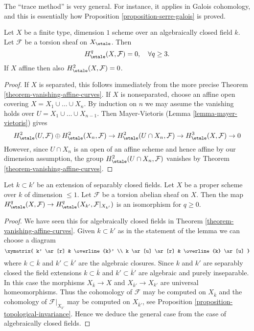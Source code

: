 \begin{remarks}
\label{remarks-on-above}
The ``trace method'' is very general. For instance, it applies in Galois
cohomology, and this is essentially how
Proposition \ref{proposition-serre-galois} is proved.
\end{remarks}

\begin{theorem}
\label{theorem-vanishing-curves}
Let $X$ be a finite type, dimension $1$ scheme over an
algebraically closed field $k$. Let $\mathcal{F}$ be a torsion sheaf
on $X_\etale$. Then
$$
H_\etale^q(X, \mathcal{F}) = 0, \quad \forall q \geq 3.
$$
If $X$ affine then also $H_\etale^2(X, \mathcal{F}) = 0$.
\end{theorem}

\begin{proof}
If $X$ is separated, this follows immediately from the more precise
Theorem \ref{theorem-vanishing-affine-curves}.
If $X$ is nonseparated, choose an affine open covering
$X = X_1 \cup \ldots \cup X_n$. By induction on $n$ we may assume
the vanishing holds over $U = X_1 \cup \ldots \cup X_{n - 1}$.
Then Mayer-Vietoris (Lemma \ref{lemma-mayer-vietoris}) gives
$$
H^2_\etale(U, \mathcal{F}) \oplus H^2_\etale(X_n, \mathcal{F}) \to
H^2_\etale(U \cap X_n, \mathcal{F}) \to
H^3_\etale(X, \mathcal{F}) \to 0
$$
However, since $U \cap X_n$ is an open of an affine scheme
and hence affine by our dimension assumption, the group
$H^2_\etale(U \cap X_n, \mathcal{F})$ vanishes
by Theorem \ref{theorem-vanishing-affine-curves}.
\end{proof}

\begin{lemma}
\label{lemma-base-change-dim-1-separably-closed}
Let $k \subset k'$ be an extension of separably closed fields.
Let $X$ be a proper scheme over $k$ of dimension $\leq 1$.
Let $\mathcal{F}$ be a torsion abelian sheaf on $X$.
Then the map $H^q_\etale(X, \mathcal{F}) \to
H^q_\etale(X_{k'}, \mathcal{F}|_{X_{k'}})$ is an isomorphism
for $q \geq 0$.
\end{lemma}

\begin{proof}
We have seen this for algebraically closed fields in
Theorem \ref{theorem-vanishing-affine-curves}.
Given $k \subset k'$ as in the statement of the lemma we can
choose a diagram
$$
\xymatrix{
k' \ar[r] & \overline{k}' \\
k \ar[u] \ar[r] & \overline{k} \ar[u]
}
$$
where $k \subset \overline{k}$ and $k' \subset \overline{k}'$ are
the algebraic closures. Since $k$ and $k'$ are separably closed
the field extensions
$k \subset \overline{k}$ and $k' \subset \overline{k}'$
are algebraic and purely inseparable. In this case the morphisms
$X_{\overline{k}} \to X$ and $X_{\overline{k}'} \to X_{k'}$
are universal homeomorphisms. Thus the cohomology of $\mathcal{F}$
may be computed on $X_{\overline{k}}$ and the cohomology
of $\mathcal{F}|_{X_{k'}}$ may be computed on $X_{\overline{k}'}$,
see Proposition \ref{proposition-topological-invariance}.
Hence we deduce the general case from the case of algebraically
closed fields.
\end{proof}




